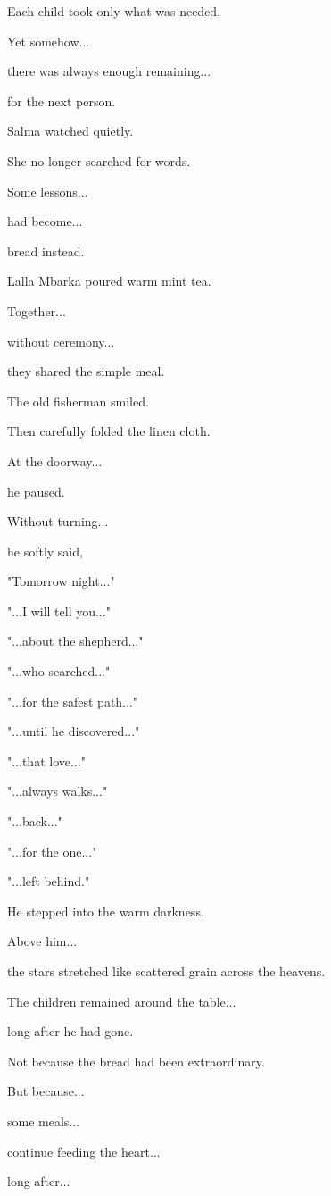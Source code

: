\documentclass[12pt,openany]{book}
\begin{document}
Each child took only what was needed.

Yet somehow...

there was always enough remaining...

for the next person.

Salma watched quietly.

She no longer searched for words.

Some lessons...

had become...

bread instead.

Lalla Mbarka poured warm mint tea.

Together...

without ceremony...

they shared the simple meal.

The old fisherman smiled.

Then carefully folded the linen cloth.

At the doorway...

he paused.

Without turning...

he softly said,

"Tomorrow night..."

"...I will tell you..."

"...about the shepherd..."

"...who searched..."

"...for the safest path..."

"...until he discovered..."

"...that love..."

"...always walks..."

"...back..."

"...for the one..."

"...left behind."

He stepped into the warm darkness.

Above him...

the stars stretched like scattered grain across the heavens.

The children remained around the table...

long after he had gone.

Not because the bread had been extraordinary.

But because...

some meals...

continue feeding the heart...

long after...
\end{document}
